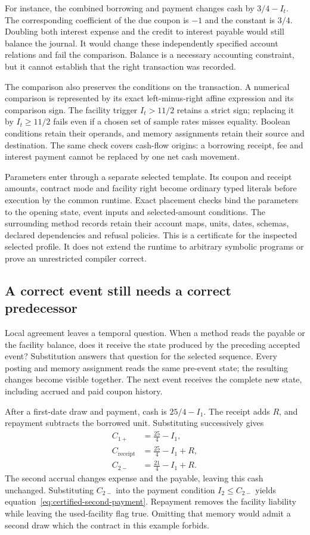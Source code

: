 For instance, the combined borrowing and payment changes cash by $3/4-I_t$. The corresponding coefficient of the due coupon is $-1$ and the constant is $3/4$. Doubling both interest expense and the credit to interest payable would still balance the journal. It would change these independently specified account relations and fail the comparison. Balance is a necessary accounting constraint, but it cannot establish that the right transaction was recorded.

The comparison also preserves the conditions on the transaction. A numerical comparison is represented by its exact left-minus-right affine expression and its comparison sign. The facility trigger $I_t>11/2$ retains a strict sign; replacing it by $I_t\geq11/2$ fails even if a chosen set of sample rates misses equality. Boolean conditions retain their operands, and memory assignments retain their source and destination. The same check covers cash-flow origins: a borrowing receipt, fee and interest payment cannot be replaced by one net cash movement.

Parameters enter through a separate selected template. Its coupon and receipt amounts, contract mode and facility right become ordinary typed literals before execution by the common runtime. Exact placement checks bind the parameters to the opening state, event inputs and selected-amount conditions. The surrounding method records retain their account maps, units, dates, schemas, declared dependencies and refusal policies. This is a certificate for the inspected selected profile. It does not extend the runtime to arbitrary symbolic programs or prove an unrestricted compiler correct.

\subsection{A correct event still needs a correct predecessor}

Local agreement leaves a temporal question. When a method reads the payable or the facility balance, does it receive the state produced by the preceding accepted event? Substitution answers that question for the selected sequence. Every posting and memory assignment reads the same pre-event state; the resulting changes become visible together. The next event receives the complete new state, including accrued and paid coupon history.

After a first-date draw and payment, cash is $25/4-I_1$. The receipt adds $R$, and repayment subtracts the borrowed unit. Substituting successively gives
\begin{align}
 C_{1+}&=\frac{25}{4}-I_1,\\
 C_{\mathrm{receipt}}&=\frac{25}{4}-I_1+R,\\
 C_{2-}&=\frac{21}{4}-I_1+R.
\end{align}
The second accrual changes expense and the payable, leaving this cash unchanged. Substituting $C_{2-}$ into the payment condition $I_2\leq C_{2-}$ yields equation~\eqref{eq:certified-second-payment}. Repayment removes the facility liability while leaving the used-facility flag true. Omitting that memory would admit a second draw which the contract in this example forbids.

